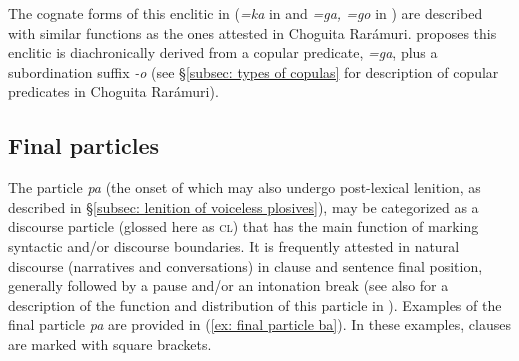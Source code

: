     \z
\z

The cognate forms of this enclitic in  (\textit{=ka} in  and \textit{=ga, =go} in ) are described with similar functions as the ones attested in Choguita Rarámuri. \citet{miller1996guarijio} proposes this enclitic is diachronically derived from a copular predicate, \textit{=ga}, plus a subordination suffix \textit{-o} (see §\ref{subsec: types of copulas} for description of copular predicates in Choguita Rarámuri).

\subsection{Final particles}
\label{subsec: final clitics}

The particle \textit{pa} (the onset of which may also undergo post-lexical lenition, as described in §\ref{subsec: lenition of voiceless plosives}), may be categorized as a discourse particle (glossed here as \textsc{cl)} that has the main function of marking syntactic and/or discourse boundaries. It is frequently attested in natural discourse (narratives and conversations) in clause and sentence final position, generally followed by a pause and/or an intonation break (see also \citealt{moralesmoreno2016rochecahi} for a description of the function and distribution of this particle in ). Examples of the final particle \textit{pa} are provided in (\ref{ex: final particle ba}). In these examples, clauses are marked with square brackets.

\ea\label{ex: final particle ba}

